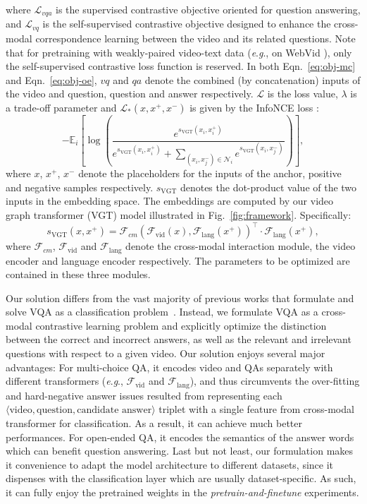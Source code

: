 \documentclass[10pt,journal,compsoc]{IEEEtran}
\newcommand{\eg}{\textit{e}.\textit{g}.}
\begin{document}
\noindent where $\mathcal{L}_{vqa}$ is the supervised contrastive objective oriented for question answering, and $\mathcal{L}_{vq}$ is the self-supervised contrastive objective designed to enhance the cross-modal correspondence learning between the video and its related questions. Note that for pretraining with weakly-paired video-text data (\eg, on WebVid \cite{bain2021frozen}), only the self-supervised contrastive loss function is reserved. In both Eqn.~\eqref{eq:obj-mc} and Eqn.~\eqref{eq:obj-oe}, $vq$ and $qa$ denote the combined (by concatenation) inputs of the video and question, question and answer respectively. $\mathcal{L}$ is the loss value, $\lambda$ is a trade-off parameter and $\mathcal{L}_*(x, x^+, x^-)$ is given by the InfoNCE loss \cite{oord2018representation}:
\begin{equation}
    -\mathbb{E}_i [\log(\frac{e^{s_{\text{VGT}}(x_i,x_i^+)}}{e^{s_{\text{VGT}}(x_i,x_i^+)}+\sum\limits_{(x_i, x_j^-)\in \mathcal{N}_i} e^{s_{\text{VGT}}(x_i, x_j^-)}})],
\end{equation}
where $x$, $x^+$, $x^-$ denote the placeholders for the inputs of the anchor, positive and negative samples respectively.  $s_{\text{VGT}}$ denotes the dot-product value of the two inputs in the embedding space. The embeddings are computed by our video graph transformer (VGT) model illustrated in Fig.~\ref{fig:framework}. Specifically: 
\begin{equation}
    s_{\text{VGT}}(x, x^+) = \mathcal{F}_{cm}(\mathcal{F}_{\text{vid}}(x), \mathcal{F}_\text{lang}(x^+))^\intercal \cdot \mathcal{F}_\text{lang}(x^+), 
\end{equation}
where $\mathcal{F}_{cm}$, $\mathcal{F}_{\text{vid}}$ and $\mathcal{F}_{\text{lang}}$ denote the cross-modal interaction module, the video encoder and language encoder respectively. The parameters to be optimized are contained in these three modules.

Our solution differs from the vast majority of previous works that formulate and solve VQA as a classification problem~\cite{jang2017tgif,lei2021less,xiao2021video}. Instead, we formulate VQA as a cross-modal contrastive learning problem and explicitly optimize the distinction between the correct and incorrect answers, as well as the relevant and irrelevant questions with respect to a given video. Our solution enjoys several major advantages: For multi-choice QA, it encodes video and QAs separately with different transformers (\eg, $\mathcal{F}_{\text{vid}}$ and $\mathcal{F}_{\text{lang}}$), and thus circumvents the over-fitting and hard-negative answer issues resulted from representing each $\langle\text{video}, \text{question}, \text{candidate answer}\rangle$ triplet with a single feature from cross-modal transformer for classification. As a result, it can achieve much better performances. For open-ended QA, it encodes the semantics of the answer words which can benefit question answering. Last but not least, our formulation makes it convenience to adapt the model architecture to different datasets, since it dispenses with the classification layer which are usually dataset-specific. As such, it can fully enjoy the pretrained weights in the \emph{pretrain-and-finetune} experiments.
\end{document}
